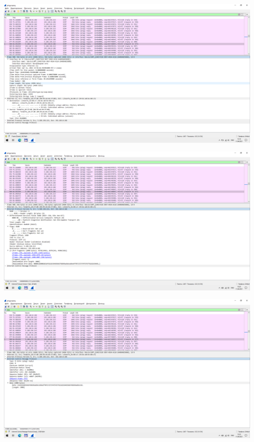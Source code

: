 \includegraphics[width=\textwidth]{screenshots/ping_2000_response_1}

\includegraphics[width=\textwidth]{screenshots/ping_2000_response_2}

\includegraphics[width=\textwidth]{screenshots/ping_2000_response_3}
